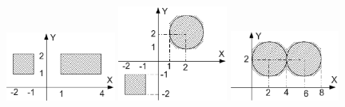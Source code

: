 \begin{figure}[h]%
\begin{floatrow}[3]
{\includegraphics[width=0.32\textwidth,keepaspectratio]{img/ris_3_73}}
{\includegraphics[width=0.32\textwidth,keepaspectratio]{img/ris_3_74}}
{\includegraphics[width=0.32\textwidth,keepaspectratio]{img/ris_3_75}}
\end{floatrow}
\end{figure}%

